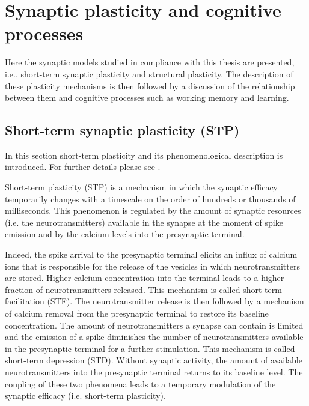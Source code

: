 \documentclass[a4paper, 12pt, twoside, openright]{book}
\begin{document}
\chapter{\textbf{Synaptic plasticity and cognitive processes}}
\label{chapter:intro_biology_synapses}

\begin{tcolorbox}[colback=white,colframe=DarkRed,title=\textbf{Summary}]
Here the synaptic models studied in compliance with this thesis are presented, i.e.,  short-term synaptic plasticity and structural plasticity. The description of these plasticity mechanisms is then followed by a discussion of the relationship between them and cognitive processes such as working memory and learning.
\end{tcolorbox}

\section{Short-term synaptic plasticity (STP)}
\label{sec:STP}
In this section short-term plasticity and its phenomenological description is introduced. For further details please see \cite{tsodyks1998, markram_wang_tsodyks1998, tsodyks2000, barak_tsodyks2007, Barri2022}.

Short-term plasticity (STP) is a mechanism in which the synaptic efficacy temporarily changes with a timescale on the order of hundreds or thousands of milliseconds. This phenomenon is regulated by the amount of synaptic resources (i.e. the neurotransmitters) available in the synapse at the moment of spike emission and by the calcium levels into the presynaptic terminal.

Indeed, the spike arrival to the presynaptic terminal elicits an influx of calcium ions that is responsible for the release of the vesicles in which neurotransmitters are stored. Higher calcium concentration into the terminal leads to a higher fraction of neurotransmitters released. This mechanism is called short-term facilitation (STF). The neurotransmitter release is then followed by a mechanism of calcium removal from the presynaptic terminal to restore its baseline concentration. 
The amount of neurotransmitters a synapse can contain is limited and the emission of a spike diminishes the number of neurotransmitters available in the presynaptic terminal for a further stimulation. This mechanism is called short-term depression (STD). Without synaptic activity, the amount of available neurotransmitters into the presynaptic terminal returns to its baseline level. 
The coupling of these two phenomena leads to a temporary modulation of the synaptic efficacy (i.e. short-term plasticity).
\end{document}
